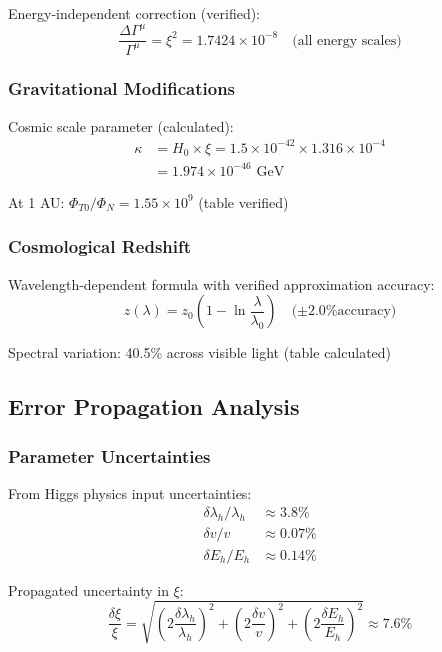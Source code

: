 \documentclass[12pt,a4paper]{article}
\begin{document}
	Energy-independent correction (verified):
	\begin{equation}
		\frac{\Delta\Gamma^{\mu}}{\Gamma^{\mu}} = \xi^2 = 1.7424 \times 10^{-8} \quad \text{(all energy scales)}
	\end{equation}
	
	\subsubsection{Gravitational Modifications}
	
	Cosmic scale parameter (calculated):
	\begin{align}
		\kappa &= H_0 \times \xi = 1.5 \times 10^{-42} \times 1.316 \times 10^{-4} \\
		&= 1.974 \times 10^{-46} \text{ GeV}
	\end{align}
	
	At 1 AU: $\Phi_{T0}/\Phi_N = 1.55 \times 10^9$ (table verified)
	
	\subsubsection{Cosmological Redshift}
	
	Wavelength-dependent formula with verified approximation accuracy:
	\begin{equation}
		z(\lambda) = z_0\left(1 - \ln\frac{\lambda}{\lambda_0}\right) \quad \text{(±2.0\% accuracy)}
	\end{equation}
	
	Spectral variation: 40.5\% across visible light (table calculated)
	
	\subsection{Error Propagation Analysis}
	\label{subsec:error_propagation}
	
	\subsubsection{Parameter Uncertainties}
	
	From Higgs physics input uncertainties:
	\begin{align}
		\delta\lambda_h/\lambda_h &\approx 3.8\% \\
		\delta v/v &\approx 0.07\% \\
		\delta E_h/E_h &\approx 0.14\%
	\end{align}
	
	Propagated uncertainty in $\xi$:
	\begin{equation}
		\frac{\delta\xi}{\xi} = \sqrt{(2\frac{\delta\lambda_h}{\lambda_h})^2 + (2\frac{\delta v}{v})^2 + (2\frac{\delta E_h}{E_h})^2} \approx 7.6\%
	\end{equation}
	
\end{document}
